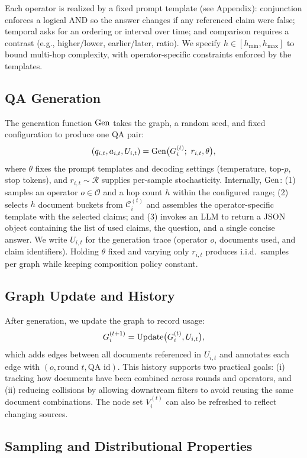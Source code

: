 Each operator is realized by a fixed prompt template (see Appendix): \textsf{conjunction} enforces a logical AND so the answer changes if any referenced claim were false; \textsf{temporal} asks for an ordering or interval over time; and \textsf{comparison} requires a contrast (e.g., higher/lower, earlier/later, ratio). We specify $h\in[h_{\min},h_{\max}]$ to bound multi-hop complexity, with operator-specific constraints enforced by the templates.

\subsection{QA Generation}
The generation function $\operatorname{Gen}$ takes the graph, a random seed, and fixed configuration to produce one QA pair:
\begin{equation}
(q_{i,t},a_{i,t},U_{i,t})=\Gen\!\big(G_i^{(t)};\ r_{i,t},\theta\big), \label{eq:gen}
\end{equation}
where $\theta$ fixes the prompt templates and decoding settings (temperature, top-$p$, stop tokens), and $r_{i,t}\sim\mathcal{R}$ supplies per-sample stochasticity. Internally, $\operatorname{Gen}$:
(1) samples an operator $o\in\mathcal{O}$ and a hop count $h$ within the configured range;
(2) selects $h$ document buckets from $\mathcal{C}_i^{(t)}$ and assembles the operator-specific template with the selected claims; and
(3) invokes an LLM to return a JSON object containing the list of used claims, the question, and a single concise answer. We write $U_{i,t}$ for the generation trace (operator $o$, documents used, and claim identifiers). Holding $\theta$ fixed and varying only $r_{i,t}$ produces i.i.d.\ samples per graph while keeping composition policy constant.

\subsection{Graph Update and History}
After generation, we update the graph to record usage:
\[
G_i^{(t+1)}=\operatorname{Update}\!\big(G_i^{(t)},U_{i,t}\big),
\]
which adds edges between all documents referenced in $U_{i,t}$ and annotates each edge with $(o,\text{round }t,\text{QA id})$. This history supports two practical goals: (i) tracking how documents have been combined across rounds and operators, and (ii) reducing collisions by allowing downstream filters to avoid reusing the same document combinations. The node set $V_i^{(t)}$ can also be refreshed to reflect changing sources.


\subsection{Sampling and Distributional Properties}

